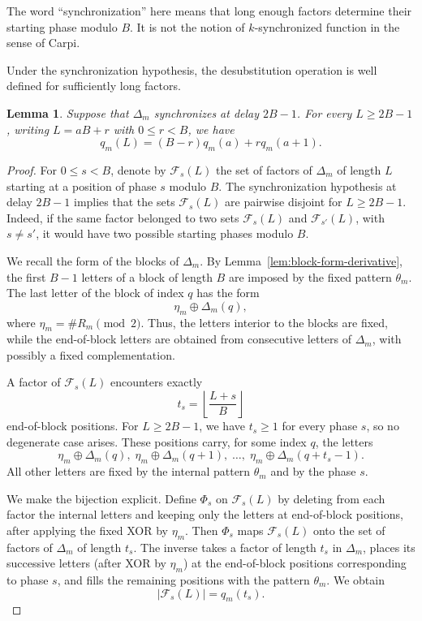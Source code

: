 \documentclass[12pt,reqno]{article}
\theoremstyle{plain}
\newtheorem{lemma}[theorem]{Lemma}
\theoremstyle{definition}
\begin{document}
The word ``synchronization'' here means that long enough factors determine their starting phase modulo $B$. It is not the notion of $k$-synchronized function in the sense of Carpi.

Under the synchronization hypothesis, the desubstitution operation is well defined for sufficiently long factors.

\begin{lemma}
\label{lem:desubstitution-generale}
Suppose that $\Delta_m$ synchronizes at delay $2B-1$. For every $L \ge 2B-1$, writing $L = aB+r$ with $0 \le r < B$, we have
\[
q_m(L) = (B-r)q_m(a) + r q_m(a+1).
\]
\end{lemma}

\begin{proof}
For $0 \le s < B$, denote by $\mathcal{F}_s(L)$ the set of factors of $\Delta_m$ of length $L$ starting at a position of phase $s$ modulo $B$. The synchronization hypothesis at delay $2B-1$ implies that the sets $\mathcal{F}_s(L)$ are pairwise disjoint for $L \ge 2B-1$. Indeed, if the same factor belonged to two sets $\mathcal{F}_s(L)$ and $\mathcal{F}_{s'}(L)$, with $s \ne s'$, it would have two possible starting phases modulo $B$.

We recall the form of the blocks of $\Delta_m$. By Lemma~\ref{lem:block-form-derivative}, the first $B-1$ letters of a block of length $B$ are imposed by the fixed pattern $\theta_m$. The last letter of the block of index $q$ has the form
\[
  \eta_m \oplus \Delta_m(q),
\]
where $\eta_m = \#R_m \pmod 2$. Thus, the letters interior to the blocks are fixed, while the end-of-block letters are obtained from consecutive letters of $\Delta_m$, with possibly a fixed complementation.

A factor of $\mathcal{F}_s(L)$ encounters exactly
\[
  t_s = \left\lfloor \frac{L+s}{B} \right\rfloor
\]
end-of-block positions. For $L \ge 2B - 1$, we have $t_s \ge 1$ for every phase $s$, so no degenerate case arises. These positions carry, for some index $q$, the letters
\[
  \eta_m \oplus \Delta_m(q), \;
  \eta_m \oplus \Delta_m(q+1), \;
  \dots, \;
  \eta_m \oplus \Delta_m(q + t_s - 1).
\]
All other letters are fixed by the internal pattern $\theta_m$ and by the phase $s$.

We make the bijection explicit. Define $\Phi_s$ on $\mathcal{F}_s(L)$ by deleting from each factor the internal letters and keeping only the letters at end-of-block positions, after applying the fixed XOR by $\eta_m$. Then $\Phi_s$ maps $\mathcal{F}_s(L)$ onto the set of factors of $\Delta_m$ of length $t_s$. The inverse takes a factor of length $t_s$ in $\Delta_m$, places its successive letters (after XOR by $\eta_m$) at the end-of-block positions corresponding to phase $s$, and fills the remaining positions with the pattern $\theta_m$. We obtain
\[
  |\mathcal{F}_s(L)| = q_m(t_s).
\]


\end{proof}
\end{document}
